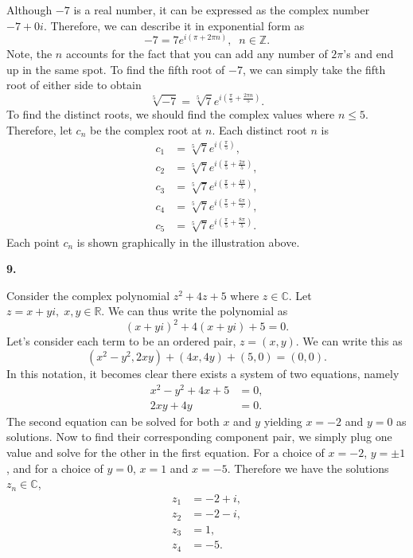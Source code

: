 \documentclass{article}
\newcommand{\qnumber}[1]{
\vspace{0.5cm}
\noindent
\textbf{#1.}
\vspace{4mm}
}
\begin{document}
Although $-7$ is a real number, it can be expressed as the complex number $-7+0i$. Therefore, we can describe it in exponential form as
\[
    -7=7e^{i(\pi + 2\pi n)},\;\;n\in\mathbb{Z}.
\]
Note, the $n$ accounts for the fact that you can add any number of $2\pi$'s and end up in the same spot. To find the fifth root of $-7$, we can simply take the fifth root of either side to obtain
\[
    \sqrt[5]{-7}=\sqrt[5]{7}e^{ i(\frac{\pi}{5}+\frac{2\pi n}{5}) }.  
\]
To find the distinct roots, we should find the complex values where $n\leq 5$. Therefore, let $c_n$ be the complex root at $n$. Each distinct root $n$ is
\[
\begin{split}
    c_1&=\sqrt[5]{7} e^{ i(\frac{\pi}{5}) }, \\
    c_2&=\sqrt[5]{7} e^{ i(\frac{\pi}{5} + \frac{2\pi}{5}) }, \\
    c_3&=\sqrt[5]{7} e^{ i(\frac{\pi}{5} + \frac{4\pi}{5}) }, \\
    c_4&=\sqrt[5]{7} e^{ i(\frac{\pi}{5} + \frac{6\pi}{5}) }, \\
    c_5&=\sqrt[5]{7} e^{ i(\frac{\pi}{5} + \frac{8\pi}{5}) }.
\end{split}
\]
Each point $c_n$ is shown graphically in the illustration above.

\qnumber{9}

Consider the complex polynomial $z^2+4z+5$ where $z\in\mathbb{C}$. Let $z=x+yi,\;x,y\in\mathbb{R}$. We can thus write the polynomial as
\[
    (x+yi)^2+4(x+yi)+5=0.  
\]
Let's consider each term to be an ordered pair, $z=(x,y)$. We can write this as
\[
    (x^2-y^2, 2xy) + (4x, 4y) + (5, 0) = (0, 0).
\]
In this notation, it becomes clear there exists a system of two equations, namely
\[
\begin{split}
    x^2-y^2+4x+5&=0, \\
    2xy + 4y &= 0.
\end{split}
\]
The second equation can be solved for both $x$ and $y$ yielding $x=-2$ and $y=0$ as solutions. Now to find their corresponding component pair, we simply plug one value and solve for the other in the first equation. For a choice of $x=-2$, $y=\pm 1$, and for a choice of $y=0$, $x=1$ and $x=-5$. Therefore we have the solutions $z_n\in\mathbb{C}$,
\[
\begin{split}
    z_1 &= -2 + i, \\
    z_2 &= -2 - i, \\
    z_3 &=  1, \\ 
    z_4 &= -5.
\end{split}
\]
\end{document}
